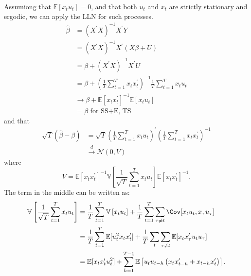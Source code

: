 Assumiong that $\mathbb{E}[x_t u_t] = 0$, and that both $u_t$ and $x_t$ are strictly stationary and ergodic,
we can apply the LLN for such processes.
\begin{align*}
    \hat{\beta} &= (X^{\prime} X)^{-1} X^{\prime} Y \\
    &= (X^{\prime} X)^{-1} X^{\prime} (X \beta + U) \\
    &= \beta + (X^{\prime} X)^{-1} X^{\prime} U \\
    &= \beta + \left( \frac{1}{T} \sum_{t=1}^{T} x_t x_t^{\prime} \right)^{-1} \frac{1}{T} \sum_{t=1}^{T} x_t u_t \\
    & \rightarrow \beta + \mathbb{E}[x_t x_t^{\prime}]^{-1} \mathbb{E}[x_t u_t] \\
    &= \beta \text{ for SS+E, TS}
\end{align*}
and that
\begin{align*}
    \sqrt{T}(\hat{\beta} - \beta) &= \sqrt{T} \left( \frac{1}{T} \sum_{t=1}^{T} x_t u_t \right)^{\prime} \left( \frac{1}{T} \sum_{t=1}^{T} x_t x_t^{\prime} \right)^{-1} \\
    &\overset{d}{\rightarrow} \mathcal{N}\left(0, V\right)
\end{align*}
where
\[
V = \mathbb{E}[x_t x_t^{\prime}]^{-1} \mathbb{V}\left[\frac{1}{\sqrt{T}} \sum_{t=1}^{T} x_t u_t\right] \mathbb{E}[x_t x_t^{\prime}]^{-1}.
\]
The term in the middle can be written as:
\begin{align*}
    \mathbb{V}\left[\frac{1}{\sqrt{T}} \sum_{t=1}^{T} x_t u_t\right] &= \frac{1}{T} \sum_{t=1}^{T} \mathbb{V}\left[x_t u_t\right] + \frac{1}{T} \sum_{t=1}^{T} \sum_{\tau \neq t} \Cov[x_t u_t ,x_{\tau} u_{\tau}] \\
    &= \frac{1}{T} \sum_{t=1}^{T} \mathbb{E}[u_t^2 x_t x_t^{\prime}] + \frac{1}{T} \sum_{t} \sum_{\tau \neq t} \mathbb{E}[x_t x_{\tau}^{\prime} u_t u_{\tau}] \\
    &= \mathbb{E}[x_t x_t^{\prime} u_t^2] + \sum_{h=1}^{T-1} \mathbb{E}\left[u_t u_{t-h} \left(x_t x_{t-h}^{\prime} + x_{t-h} x_t^{\prime} \right)\right].
\end{align*}
